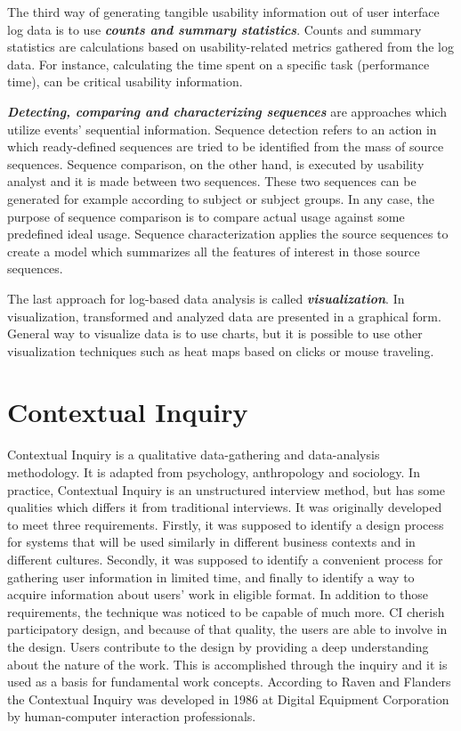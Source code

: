 \documentclass[12pt,a4paper,oneside,pdftex]{report}
\begin{document}
The third way of generating tangible usability information out of user interface log data is to use \textbf{\emph{counts and summary statistics}}. Counts and summary statistics are calculations based on usability-related metrics gathered from the log data. For instance, calculating the time spent on a specific task (performance time), can be critical usability information. \cite{RefWorks:24, RefWorks:25}

\textbf{\emph{Detecting, comparing and characterizing sequences}} are approaches which utilize events' sequential information. Sequence detection refers to an action in which ready-defined sequences are tried to be identified from the mass of source sequences. Sequence comparison, on the other hand, is  executed by usability analyst and it is made between two sequences. These two sequences can be generated for example according to subject or subject groups. In any case, the purpose of sequence comparison is to compare actual usage against some predefined ideal usage. Sequence characterization applies the source sequences to create a model which summarizes all the features of interest in those source sequences. \cite{RefWorks:24, RefWorks:25}
 
The last approach for log-based data analysis is called \textbf{\emph{visualization}}. In visualization, transformed and analyzed data are  presented in a graphical form. General way to visualize data is to use charts, but it is possible to use other visualization techniques such as heat maps based on clicks or mouse traveling. \cite{RefWorks:24, RefWorks:25}

\section{Contextual Inquiry}
\label{sec:cinquiry}
Contextual Inquiry is a qualitative data-gathering and data-analysis methodology. It is adapted from psychology, anthropology and sociology. \cite{RefWorks:28} In practice, Contextual Inquiry is an unstructured interview method, but has some qualities which differs it from traditional interviews.\cite{RefWorks:23}  It was originally developed to meet three requirements. Firstly, it was supposed to identify a design process for systems that will be used similarly in different business contexts and in different cultures. Secondly, it was supposed to identify a convenient process for gathering user information in limited time, and finally to identify a way to acquire information about users' work in eligible format. In addition to those requirements, the technique was noticed to be capable of much more. CI cherish participatory design, and because of that quality, the users are able to involve in the design. Users contribute to the design by providing a deep understanding about the nature of the work. This is accomplished through the inquiry and it is used as a basis for fundamental work concepts. \cite{RefWorks:14} According to Raven and Flanders \cite{RefWorks:28} the Contextual Inquiry was developed in 1986 at Digital Equipment Corporation by human-computer interaction professionals. \cite{RefWorks:28} 
\end{document}
